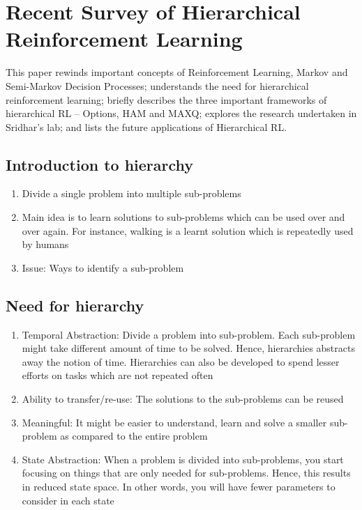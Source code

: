 \section{Recent Survey of Hierarchical Reinforcement Learning}

This paper rewinds important concepts of Reinforcement Learning, Markov and Semi-Markov Decision Processes; understands the need for hierarchical reinforcement learning; briefly describes the three important frameworks of hierarchical RL – Options, HAM and MAXQ; explores the research undertaken in Sridhar’s lab; and lists the future applications of Hierarchical RL.


\subsection{Introduction to hierarchy}
\begin{enumerate}
\item[] Divide a single problem into multiple sub-problems
\item[] Main idea is to learn solutions to sub-problems which can be used over and over again. For instance, walking is a learnt solution which is repeatedly used by humans 
\item[] Issue: Ways to identify a sub-problem
\end{enumerate}



\subsection{Need for hierarchy} 
\begin{enumerate}
\item Temporal Abstraction: Divide a problem into sub-problem. Each sub-problem might take different amount of time to be solved. Hence, hierarchies abstracts away the notion of time. Hierarchies can also be developed to spend lesser efforts on tasks which are not repeated often

\item Ability to transfer/re-use: The solutions to the sub-problems can be reused  

\item Meaningful: It might be easier to understand, learn and solve a smaller sub-problem as compared to the entire problem

\item State Abstraction: When a problem is divided into sub-problems, you start focusing on things that are only needed for sub-problems. Hence, this results in reduced state space. In other words, you will have fewer parameters to consider in each state 
\end{enumerate}




